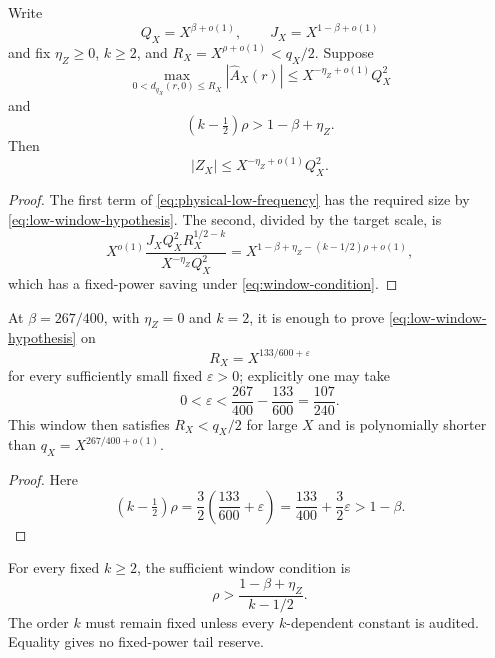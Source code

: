 \begin{theorem}
\label{thm:critical-window}
Write
\[
 Q_X=X^{\beta+o(1)},\qquad J_X=X^{1-\beta+o(1)}
\]
and fix \(\eta_Z\ge0\), \(k\ge2\), and
\(R_X=X^{\rho+o(1)}<q_X/2\).  Suppose
\begin{equation}
 \max_{0<d_{q_X}(r,0)\le R_X}|\widehat A_X(r)|
 \le X^{-\eta_Z+o(1)}Q_X^2
\label{eq:low-window-hypothesis}
\end{equation}
and
\begin{equation}
 (k-\tfrac12)\rho>1-\beta+\eta_Z.
\label{eq:window-condition}
\end{equation}
Then
\begin{equation}
 |Z_X|\le X^{-\eta_Z+o(1)}Q_X^2.
\label{eq:zero-mode-conclusion}
\end{equation}
\end{theorem}

\begin{proof}
The first term of \eqref{eq:physical-low-frequency} has the required
size by \eqref{eq:low-window-hypothesis}.  The second, divided by the
target scale, is
\[
 X^{o(1)}
 \frac{J_XQ_X^2R_X^{1/2-k}}
 {X^{-\eta_Z}Q_X^2}
 =
 X^{1-\beta+\eta_Z-(k-1/2)\rho+o(1)},
\]
which has a fixed-power saving under
\eqref{eq:window-condition}.
\end{proof}

\begin{corollary}
\label{cor:triangular-critical}
At \(\beta=267/400\), with \(\eta_Z=0\) and \(k=2\), it is enough to
prove \eqref{eq:low-window-hypothesis} on
\begin{equation}
 R_X=X^{133/600+\varepsilon}
\label{eq:triangular-window}
\end{equation}
for every sufficiently small fixed \(\varepsilon>0\); explicitly one
may take
\[
 0<\varepsilon<\frac{267}{400}-\frac{133}{600}
 =\frac{107}{240}.
\]
This window then satisfies \(R_X<q_X/2\) for large \(X\) and is
polynomially shorter than \(q_X=X^{267/400+o(1)}\).
\end{corollary}

\begin{proof}
Here
\[
 (k-\tfrac12)\rho
 =\frac32\left(\frac{133}{600}+\varepsilon\right)
 =\frac{133}{400}+\frac32\varepsilon
 >1-\beta.
\]
\end{proof}

\begin{remark}
For every fixed \(k\ge2\), the sufficient window condition is
\[
 \rho>\frac{1-\beta+\eta_Z}{k-1/2}.
\]
The order \(k\) must remain fixed unless every \(k\)-dependent
constant is audited.  Equality gives no fixed-power tail reserve.
\end{remark}

